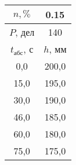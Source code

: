 \begin{tabular}[t]{|c|c|}
\hline
$n, \%$ & 0.15 \\
\hline
$P$, дел & 140 \\
\hline
$t_{абс}$, с & $h$, мм \\ 
\hline
0,0 & 200,0 \\ 
15,0 & 195,0 \\ 
30,0 & 190,0 \\ 
46,0 & 185,0 \\ 
60,0 & 180,0 \\ 
75,0 & 175,0 \\ 
\hline
\end{tabular}
